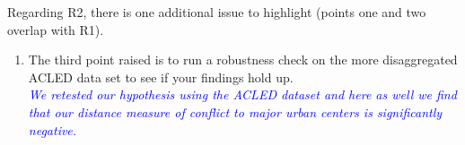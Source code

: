 Regarding R2, there is one additional issue to highlight (points one and two overlap with R1).

\begin{enumerate}
\item The third point raised is to run a robustness check on the more disaggregated ACLED data set to see if your findings hold up. \\

\textcolor{blue}{\emph{
	We retested our hypothesis using the ACLED dataset and here as well we find that our distance measure of conflict to major urban centers is significantly negative. 
}}

\end{enumerate}